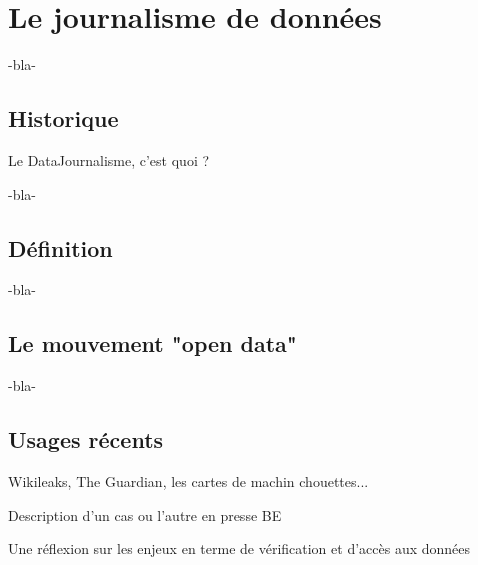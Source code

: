 
\chapter{Le journalisme de données}


-bla-

\section{Historique}

Le DataJournalisme, c'est quoi ?

-bla-

\section{Définition}

-bla-

\section{Le mouvement "open data"}

-bla-

\section{Usages récents}

Wikileaks, The Guardian, les cartes de machin chouettes...


Description d'un cas ou l'autre en presse BE

Une réflexion sur les enjeux en terme de vérification et d'accès aux données


